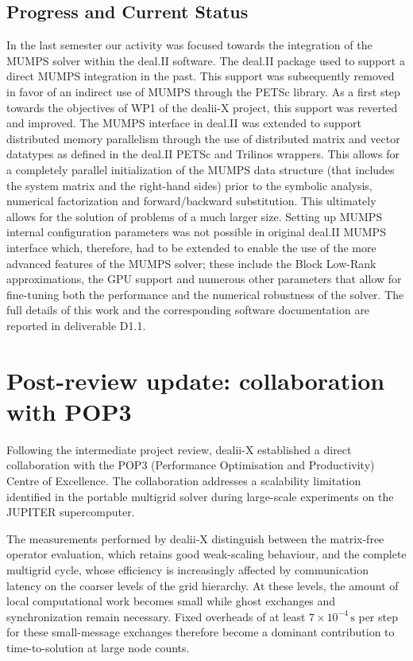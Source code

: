 \documentclass[a4paper,12pt]{article}
\begin{document}
    \subsection{Progress and Current Status}
  In the last semester our activity was focused towards the integration of the MUMPS solver within the deal.II software. The deal.II package used to support a direct MUMPS integration in the past. This support was subsequently removed in favor of an indirect use of MUMPS through the PETSc library. As a first step towards the objectives of WP1 of the dealii-X
project, this support was reverted and improved. The MUMPS interface in deal.II was extended to support distributed memory parallelism through the use of distributed matrix and vector datatypes as defined in the deal.II PETSc and Trilinos wrappers. This allows for a completely parallel initialization of the MUMPS data structure (that includes the system matrix and the right-hand sides) prior to the symbolic analysis, numerical factorization and forward/backward substitution. This ultimately allows for the solution of problems of a much larger size. Setting up MUMPS internal configuration parameters was not possible in original
deal.II MUMPS interface which, therefore, had to be extended to enable the use of the more advanced features of the MUMPS solver; these include the Block Low-Rank approximations, the GPU support and numerous other parameters that allow for fine-tuning both the performance and the numerical robustness of the solver. The full details of this work and the corresponding software documentation are reported in deliverable D1.1.

\section{Post-review update: collaboration with POP3}
\label{sec:pop3}

Following the intermediate project review, dealii-X established a direct
collaboration with the POP3 (Performance Optimisation and Productivity)
Centre of Excellence. The collaboration addresses a scalability limitation
identified in the portable multigrid solver during large-scale experiments
on the JUPITER supercomputer.

The measurements performed by dealii-X distinguish between the matrix-free
operator evaluation, which retains good weak-scaling behaviour, and the
complete multigrid cycle, whose efficiency is increasingly affected by
communication latency on the coarser levels of the grid hierarchy. At these
levels, the amount of local computational work becomes small while ghost
exchanges and synchronization remain necessary. Fixed overheads of at least
$7\times10^{-4}\,\mathrm{s}$ per step for these small-message exchanges
therefore become a dominant contribution to time-to-solution at large node
counts.
\end{document}
